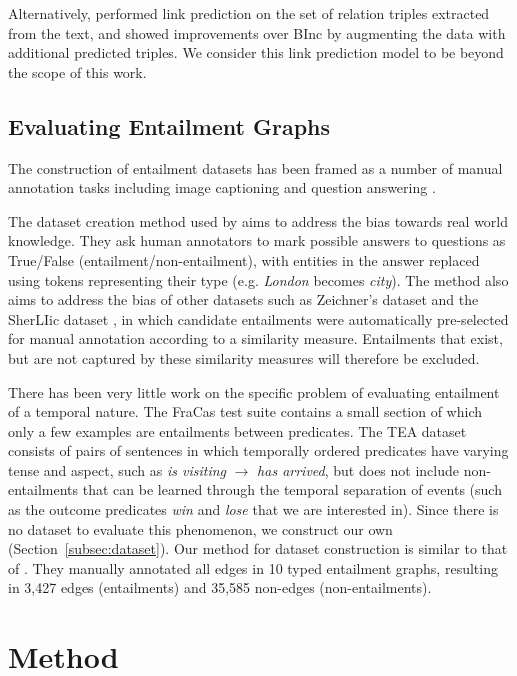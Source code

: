 \documentclass[11pt]{article}
\begin{document}
Alternatively,  performed link prediction on the set of relation triples extracted from the text, and showed improvements over BInc by augmenting the data with additional predicted triples. We consider this link prediction model to be beyond the scope of this work.


\subsection{Evaluating Entailment Graphs}
\label{subsec:evaluating_entailment_graphs}

The construction of entailment datasets has been framed as a number of manual annotation tasks including image captioning \cite{bowman2015} and question answering \cite{levy2016}.

The dataset creation method used by  aims to address the bias towards real world knowledge. They ask human annotators to mark possible answers to questions as True/False (entailment/non-entailment), with entities in the answer replaced using tokens representing their type (e.g. \textit{London} becomes \textit{city}). The method also aims to address the bias of other datasets such as Zeichner's dataset \cite{zeichner2012} and the SherLIic dataset \cite{schmitt2019}, in which candidate entailments were automatically pre-selected for manual annotation according to a similarity measure. Entailments that exist, but are not captured by these similarity measures will therefore be excluded.

There has been very little work on the specific problem of evaluating entailment of a temporal nature. The FraCas test suite \cite{cooper1996} contains a small section of which only a few examples are entailments between predicates. The TEA dataset \cite{kober2019} consists of pairs of sentences in which temporally ordered predicates have varying tense and aspect, such as \textit{is visiting} $\rightarrow$ \textit{has arrived}, but does not include non-entailments that can be learned through the temporal separation of events (such as the outcome predicates \textit{win} and \textit{lose} that we are interested in). Since there is no dataset to evaluate this phenomenon, we construct our own (Section~\ref{subsec:dataset}). Our method for dataset construction is similar to that of . They manually annotated all edges in 10 typed entailment graphs, resulting in 3,427 edges (entailments) and 35,585 non-edges (non-entailments).


\section{Method}
\label{sec:method}
\end{document}
